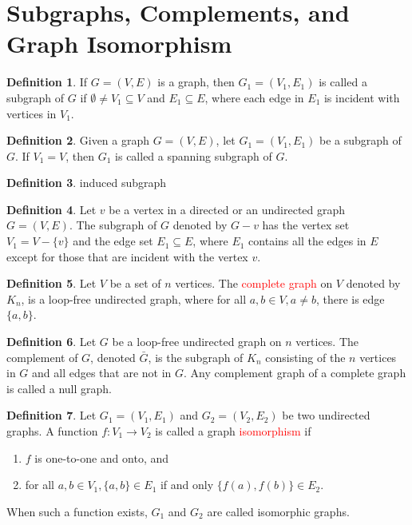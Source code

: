 \documentclass[letter]{book}
\theoremstyle{definition}
\theoremstyle{definition}
\newtheorem{mydef}{Definition}[chapter]
\theoremstyle{remark}
\begin{document}
\section{Subgraphs, Complements, and Graph Isomorphism}
\begin{mydef}
    If $G=(V,E)$ is a graph, then $G_1=(V_1,E_1)$ is called a subgraph of $G$ if $\emptyset\neq V_1\subseteq V$ and $E_1\subseteq E$, where each edge in $E_1$ is incident with vertices in $V_1$.
\end{mydef}
\bigskip
\begin{mydef}
    Given a graph $G=(V,E)$, let $G_1=(V_1,E_1)$ be a subgraph of $G$. If $V_1=V$, then $G_1$ is called a spanning subgraph of $G$.
\end{mydef}
\bigskip
\begin{mydef}
    induced subgraph
\end{mydef}
\bigskip
\begin{mydef}
    Let $v$ be a vertex in a directed or an undirected graph $G=(V,E)$. The subgraph of $G$ denoted by $G-v$ has the vertex set $V_1=V-\{v\}$ and the edge set $E_1\subseteq E$, where $E_1$ contains all the edges in $E$ except for those that are incident with the vertex $v$.
\end{mydef}
\bigskip
\begin{mydef}
    Let $V$ be a set of $n$ vertices. The \textcolor{red}{complete graph} on $V$ denoted by $K_n$, is a loop-free undirected graph, where for all $a,b\in V, a\neq b$, there is edge $\{a,b\}$.
\end{mydef}
\bigskip
\begin{mydef}
    Let $G$ be a loop-free undirected graph on $n$ vertices. The complement of $G$, denoted $\bar G$, is the subgraph of $K_n$ consisting of the $n$ vertices in $G$ and all edges that are not in $G$. Any complement graph of a complete graph is called a null graph.
\end{mydef}
\bigskip
\begin{mydef}
    Let $G_1=(V_1,E_1)$ and $G_2=(V_2,E_2)$ be two undirected graphs. A function $f:V_1\rightarrow V_2$ is called a graph \textcolor{red}{isomorphism} if
    \begin{enumerate}[label=\alph*)]
        \item $f$ is one-to-one and onto, and
        \item for all $a,b\in V_1, \{a,b\}\in E_1$ if and only $\{f(a),f(b)\}\in E_2$.
    \end{enumerate}
    When such a function exists, $G_1$ and $G_2$ are called isomorphic graphs.
\end{mydef}
\end{document}
